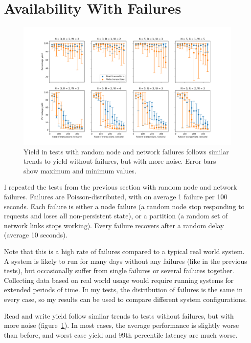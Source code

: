 \documentclass[12pt,a4paper,twoside,openany]{report}
\begin{document}
\newpage

\section{Availability With Failures}

\begin{figure}[hbt]
\centerline{\includegraphics[width=\paperwidth]{figs/eval-fig-2.png}}
\caption{Yield in tests with random node and network failures follows similar trends to yield without failures, but with more noise. Error bars show maximum and minimum values.}
\label{yield35normal}
\end{figure}

I repeated the tests from the previous section with random node and network failures. Failures are Poisson-distributed, with on average 1 failure per 100 seconds. Each failure is either a node failure (a random node stop responding to requests and loses all non-persistent state), or a partition (a random set of network links stops working). Every failure recovers after a random delay (average 10 seconds).

Note that this is a high rate of failures compared to a typical real world system. A system is likely to run for many days without any failures (like in the previous tests), but occasionally suffer from single failures or several failures together. Collecting data based on real world usage would require running systems for extended periods of time. In my tests, the distribution of failures is the same in every case, so my results can be used to compare different system configurations.

Read and write yield follow similar trends to tests without failures, but with more noise (figure~\ref{yield35normal}). In most cases, the average performance is slightly worse than before, and worst case yield and 99th percentile latency are much worse.
\end{document}
